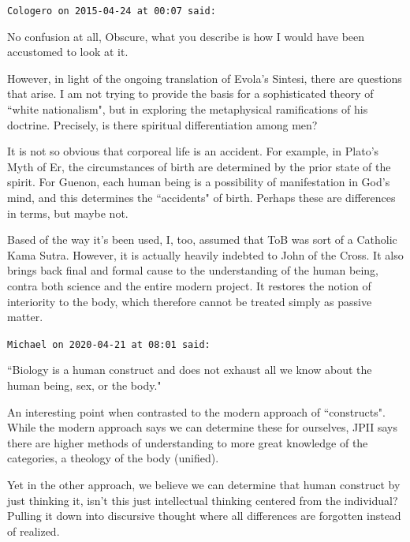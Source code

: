 \begin{footnotesize}
\begin{sffamily}
\hfill

\texttt{Cologero on 2015-04-24 at 00:07 said: }

No confusion at all, Obscure, what you describe is how I would have been accustomed to look at it.

However, in light of the ongoing translation of Evola's Sintesi, there are questions that arise. I am not trying to provide the basis for a sophisticated theory of ``white nationalism", but in exploring the metaphysical ramifications of his doctrine. Precisely, is there spiritual differentiation among men?

It is not so obvious that corporeal life is an accident. For example, in Plato's Myth of Er, the circumstances of birth are determined by the prior state of the spirit. For Guenon, each human being is a possibility of manifestation in God's mind, and this determines the ``accidents" of birth. Perhaps these are differences in terms, but maybe not.

Based of the way it's been used, I, too, assumed that ToB was sort of a Catholic Kama Sutra. However, it is actually heavily indebted to John of the Cross. It also brings back final and formal cause to the understanding of the human being, contra both science and the entire modern project. It restores the notion of interiority to the body, which therefore cannot be treated simply as passive matter.


\hfill

\texttt{Michael on 2020-04-21 at 08:01 said: }

``Biology is a human construct and does not exhaust all we know about the human being, sex, or the body."

An interesting point when contrasted to the modern approach of ``constructs". While the modern approach says we can determine these for ourselves, JPII says there are higher methods of understanding to more great knowledge of the categories, a theology of the body (unified).

Yet in the other approach, we believe we can determine that human construct by just thinking it, isn't this just intellectual thinking centered from the individual? Pulling it down into discursive thought where all differences are forgotten instead of realized.

\hfill

\end{sffamily}\end{footnotesize}